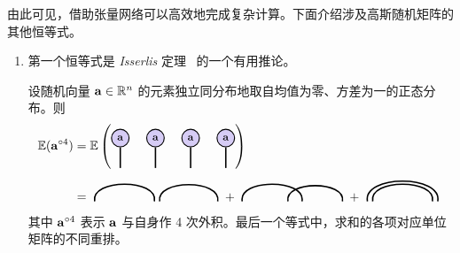 由此可见，借助张量网络可以高效地完成复杂计算。下面介绍涉及高斯随机矩阵的其他恒等式。
\begin{enumerate}
\item  第一个恒等式是 \emph{Isserlis} 定理~\citep{isserlis1918formula} 的一个有用推论。
\begin{theorem}\label{thm:isserlis}
设随机向量 $\mathbf{a}\in\mathbb{R}^{n}$ 的元素独立同分布地取自均值为零、方差为一的正态分布。则
\begin{align*}
\EE(\ab^{\outprod 4}) 
&= 
\EE\left(\begin{tikzpicture}[baseline=\baseline]
   \tikzset{tensor/.style = {minimum size = 0.5cm,shape = circle,thick,draw=black,inner sep = 0pt}, edge/.style = {thick,line width=.4mm},every loop/.style={}}
    \def\y{0.25}
    \def\x{0}
    \node[tensor,fill=red!20!blue!20!white] (a1) at (\x,\y){\scalebox{0.85}{$\ab$}}; 
    \node[tensor,fill=red!20!blue!20!white] (a2) at (\x+1,\y){\scalebox{0.85}{$\ab$}}; 
    \node[tensor,fill=red!20!blue!20!white] (a3) at (\x+2,\y){\scalebox{0.85}{$\ab$}}; 
    \node[tensor,fill=red!20!blue!20!white] (a4) at (\x+3,\y){\scalebox{0.85}{$\ab$}}; 
    \draw[edge](a1) -- (\x,\y-0.85);
    \draw[edge](a2) -- (\x+1,\y-0.85);
    \draw[edge](a3) -- (\x+2,\y-0.85);
    \draw[edge](a4) -- (\x+3,\y-0.85);
\end{tikzpicture}
\right)\\
&=
\begin{tikzpicture}[baseline=\baseline]
    \tikzset{tensor/.style = {minimum size = 0.5cm,shape = circle,thick,draw=black,inner sep = 0pt}, edge/.style = {thick,line width=.4mm},every loop/.style={}}
    \def\y{0}
    \def\x{0}
    \draw[edge] (\x+0.15,\y-0.1) to [out=100,in=80] (\x+1.85,\y-0.1);
    \draw[edge] (\x+2,\y-0.1) to [out=100,in=80] (\x+3.65,\y-0.1);
\end{tikzpicture}
+
\begin{tikzpicture}[baseline=\baseline]
    \tikzset{tensor/.style = {minimum size = 0.5cm,shape = circle,thick,draw=black,inner sep = 0pt}, edge/.style = {thick,line width=.4mm},every loop/.style={}}
    \def\y{0}
    \def\x{0}
    \draw[edge] (\x+0.15,\y-0.1) to [out=100,in=80] (\x+1.85,\y-0.1);
    \draw[edge] (\x+1.45,\y-0.1) to [out=100,in=80] (\x+3,\y-0.1);
\end{tikzpicture}
+
    \begin{tikzpicture}[baseline=\baseline]
    \tikzset{tensor/.style = {minimum size = 0.5cm,shape = circle,thick,draw=black,inner sep = 0pt}, edge/.style = {thick,line width=.4mm},every loop/.style={}}
    \def\y{0}
    \def\x{0}
    \draw[edge] (\x,\y-0.1) to [out=100,in=80] (\x+2,\y-0.1);
    \draw[edge] (\x+0.15,\y-0.1) to [out=100,in=80] (\x+1.85,\y-0.1);
\end{tikzpicture}
\end{align*}
其中 $\mathbf{a}^{\circ 4}$ 表示 $\mathbf{a}$ 与自身作 4 次外积。最后一个等式中，求和的各项对应单位矩阵的不同重排。


\end{theorem}
\end{enumerate}
